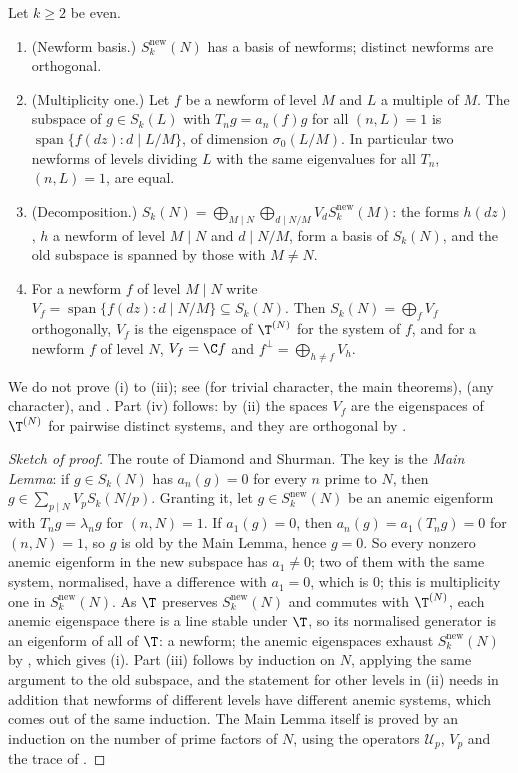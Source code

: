 \begin{theorem}\label{thm:hecke:atkin-lehner}
Let $k\ge2$ be even.
\begin{enumerate}[label=(\roman*)]
\item (Newform basis.) $S_k^{\mathrm{new}}(N)$ has a basis of newforms; distinct newforms are orthogonal.
\item (Multiplicity one.) Let $f$ be a newform of level $M$ and $L$ a multiple of $M$. The subspace of $g\in S_k(L)$ with $T_ng=a_n(f)g$ for all $(n,L)=1$ is $\operatorname{span}\{f(dz):d\mid L/M\}$, of
dimension $\sigma_0(L/M)$. In particular two newforms of levels dividing $L$ with the same eigenvalues for all $T_n$, $(n,L)=1$, are equal.
\item (Decomposition.) $S_k(N)=\bigoplus_{M\mid N}\bigoplus_{d\mid N/M}V_dS_k^{\mathrm{new}}(M)$: the forms $h(dz)$, $h$ a newform of level $M\mid N$ and $d\mid N/M$, form a basis of $S_k(N)$,
and the old subspace is spanned by those with $M\ne N$.
\item For a newform $f$ of level $M\mid N$ write $V_f=\operatorname{span}\{f(dz):d\mid N/M\}\subseteq S_k(N)$. Then $S_k(N)=\bigoplus_fV_f$ orthogonally, $V_f$ is the eigenspace of $\T^{(N)}$ for the
system of $f$, and for a newform $f$ of level $N$, $V_f=\C f$ and $f^\perp=\bigoplus_{h\ne f}V_h$.
\end{enumerate}
We do not prove (i) to (iii); see \cite{AtkinLehner70} (for trivial character, the main theorems), \cite{Li75} (any character), \cite[Sections 5.6 to 5.8]{DiamondShurman} and
\cite[Section 4.6]{Miyake}. Part (iv) follows: by (ii) the spaces $V_f$ are the eigenspaces of $\T^{(N)}$ for pairwise distinct systems, and they are orthogonal by
.
\end{theorem}

\begin{proof}[Sketch of proof]
The route of Diamond and Shurman. The key is the \emph{Main Lemma}: if $g\in S_k(N)$ has $a_n(g)=0$ for every $n$ prime to $N$, then $g\in\sum_{p\mid N}V_pS_k(N/p)$. Granting it, let $g\in
S_k^{\mathrm{new}}(N)$ be an anemic eigenform with $T_ng=\lambda_ng$ for $(n,N)=1$. If $a_1(g)=0$, then $a_n(g)=a_1(T_ng)=0$ for $(n,N)=1$, so $g$ is old by the Main Lemma, hence $g=0$. So every
nonzero anemic eigenform in the new subspace has $a_1\ne0$; two of them with the same system, normalised, have a difference with $a_1=0$, which is $0$; this is multiplicity one
in $S_k^{\mathrm{new}}(N)$. As $\T$ preserves $S_k^{\mathrm{new}}(N)$ and commutes with $\T^{(N)}$, each anemic eigenspace there is a line stable under $\T$, so its normalised generator is
an eigenform of all of $\T$: a newform; the anemic eigenspaces exhaust $S_k^{\mathrm{new}}(N)$ by , which gives (i). Part (iii) follows by induction on $N$,
applying the same argument to the old subspace, and the statement for other levels in (ii) needs in addition that newforms of different levels have different anemic
systems, which comes out of the same induction. The Main Lemma itself is proved by an induction on the number of prime factors of $N$, using the operators $\mathcal U_p$, $V_p$
and the trace of  \cite[Section 5.7]{DiamondShurman}.
\end{proof}

